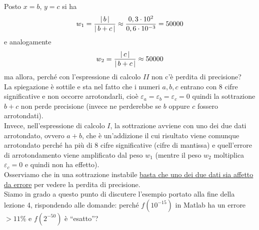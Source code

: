 Posto $x=b$, $y=c$ si ha \[w_1 = \frac{\lvert\,b\,\rvert}{\lvert\,b+c\,\rvert} \approx \frac{0,3 \cdot 10^2}{0,6 \cdot 10^{-3}} = 50000\] 
e analogamente \[w_2 = \frac{\lvert\,c\,\rvert}{\lvert\,b+c\,\rvert} \approx 50000\]
ma allora, perché con l'espressione di calcolo $II$ non c'è perdita di precisione?\\
La spiegazione è sottile e sta nel fatto che i numeri $a, b, c$ entrano con 8 cifre significative e non occorre arrotondarli, cioè $\varepsilon_a = \varepsilon_b = \varepsilon_c = 0$ quindi la sottrazione $b+c$ non perde precisione (invece ne perderebbe se $b$ oppure $c$ fossero arrotondati).\\
Invece, nell'espressione di calcolo $I$, la sottrazione avviene con uno dei due dati arrotondato, ovvero $a+b$, che è un'addizione il cui risultato viene comunque arrotondato perché ha più di 8 cifre significative (cifre di mantissa) e quell'errore di arrotondamento viene amplificato dal peso $w_1$ (mentre il peso $w_2$ moltiplica $\varepsilon_c = 0$ e quindi non ha effetto).\\
Osserviamo che in una sottrazione instabile \uline{basta che uno dei due dati sia affetto da errore} per vedere la perdita di precisione.\\
Siamo in grado a questo punto di discutere l'esempio portato alla fine della lezione 4, rispondendo alle domande: perché $f(10^{-15})$ in Matlab ha un errore $>11\%$ e $f(2^{-50})$ è “esatto”?
 
